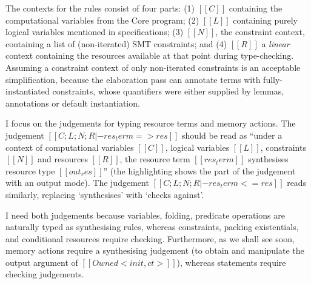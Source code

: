 \documentclass[11pt]{article}%
\begin{document}
The contexts for the rules consist of four parts: (1) $[[ C ]]$ containing the
computational variables from the Core program; (2) $[[ L ]]$ containing purely
logical variables mentioned in specifications; (3) $[[ N ]]$, the constraint
context, containing a list of (non-iterated) SMT constraints; and (4) $[[ R ]]$ a
\emph{linear} context containing the resources available at that point during
type-checking. Assuming a constraint context of only non-iterated constraints
is an acceptable simplification, because the elaboration pass can annotate terms
with fully-instantiated constraints, whose quantifiers were either supplied
by lemmas, annotations or default instantiation.

I focus on the judgements for typing resource terms and memory actions. The
judgement $[[ C ; L ; N ; R |- res_term => res ]]$ should be read as ``under a
context of computational variables $[[ C ]]$, logical variables $[[ L ]]$,
constraints $[[ N ]]$ and resources $[[ R ]]$, the resource term
$[[ res_term ]]$ synthesises resource type $[[ out_res ]]$'' (the highlighting shows the
part of the judgement with an \colorbox{red!10}{output mode}). The judgement
$[[ C ; L ; N ; R |- res_term <= res ]]$ reads similarly, replacing
`synthesises' with `checks against'.

I need both judgements because variables, folding, predicate operations are
naturally typed as synthesising rules, whereas constraints, packing
existentials, and conditional resources require checking.  Furthermore, as we
shall see soon, memory actions require a synthesising judgement (to obtain and
manipulate the output argument of $[[ Owned < init , ct > ]]$), whereas
statements require checking judgements.

\begin{figure}[t]
\small
\centering
\begingroup
\NewCommandCopy{\origcndrule}{\cndrule}
\renewcommand{\cndrule}[4][]{\origcndrule[#1]{#2}{%
\begin{minipage}{0.8\textwidth}
    \raggedright
    \leftskip 2em
    \parindent -2em
    $#3$
\end{minipage}
}{#4}}%
\begin{minipage}{.4\textwidth}
\vspace{-2\baselineskip}
\cndruleResXXChkXXIfXXTrue{}%
\\[-1\baselineskip]
\\[-1\baselineskip]
\vspace{-2\baselineskip}
\end{minipage}
\begin{minipage}{.5\textwidth}
\vspace{-2\baselineskip}
\\[-1\baselineskip]
\\[-1\baselineskip]
\vspace{-2\baselineskip}
\end{minipage}
\endgroup
\end{figure}
\end{document}
